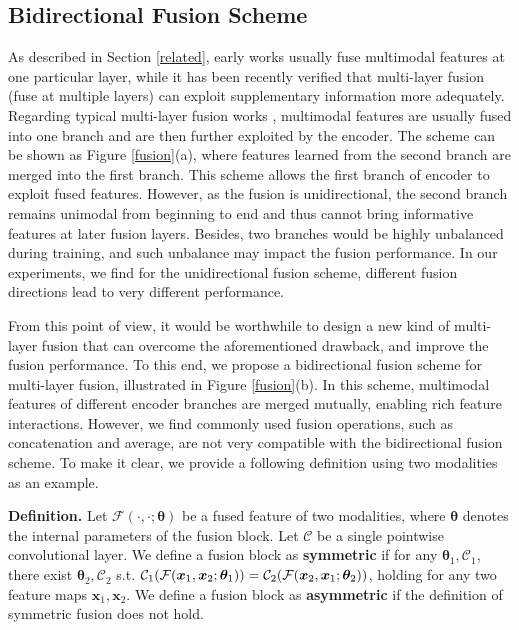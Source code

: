 \documentclass[sigconf]{acmart}
\begin{document}
\subsection{Bidirectional Fusion Scheme}
\label{sec:shuffleshift}
As described in Section \ref{related}, early works usually fuse multimodal features at one particular layer, while it has been recently verified that multi-layer fusion (fuse at multiple layers) can exploit supplementary information more adequately. Regarding typical multi-layer fusion works \cite{DBLP:conf/accv/HazirbasMDC16,DBLP:conf/cvpr/ZengTHYSCW19}, multimodal features are usually fused into one branch and are then further exploited by the encoder. The scheme can be shown as Figure \ref{fusion}(a), where features learned from the second branch are merged into the first branch. This scheme allows the first branch of encoder to exploit fused features. However, as the fusion is unidirectional, the second branch remains unimodal from beginning to end and thus cannot bring informative features at later fusion layers. Besides, two branches would be highly unbalanced during training, and such unbalance may impact the fusion performance. In our experiments, we find for the unidirectional fusion scheme, different fusion directions lead to very different performance. 




From this point of view, it would be worthwhile to design a new kind of multi-layer fusion that can overcome the aforementioned drawback, and improve the fusion performance. To this end, we propose a bidirectional fusion scheme for multi-layer  fusion, illustrated in Figure \ref{fusion}(b). In this scheme, multimodal features of different encoder branches are merged mutually, enabling rich feature interactions. However, we find commonly used fusion operations, such as concatenation and average, are not very compatible with the bidirectional fusion scheme. To make it clear, we provide a following definition using two modalities as an example.


\textbf{Definition.} Let $\mathcal{F}(\cdot,\cdot;\bm{\theta})$ be a fused feature of two modalities, where $\bm{\theta}$ denotes the internal parameters of the fusion block. Let $\mathcal{C}$ be a single pointwise convolutional layer. We define a fusion block as \textbf{symmetric} if for any $\bm{\theta}_1,\mathcal{C}_1$, there exist $\bm{\theta}_2,\mathcal{C}_2$ s.t. $\mathcal{C}_1(\mathcal{F}(\bm{x}_1, \bm{x}_2;\\\bm{\theta}_1))=\mathcal{C}_2(\mathcal{F}(\bm{x}_2, \bm{x}_1;\bm{\theta}_2))$, holding for any two feature maps $\bm{x}_1, \bm{x}_2$. We define a fusion block as \textbf{asymmetric} if the definition of symmetric fusion does not hold.
\end{document}
